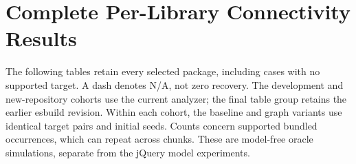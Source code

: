 \section{Complete Per-Library Connectivity Results}
\label{sec:simulation-library-results}
The following tables retain every selected package, including cases with no supported target. A dash denotes N/A, not zero recovery. The development and new-repository cohorts use the current analyzer; the final table group retains the earlier esbuild revision. Within each cohort, the baseline and graph variants use identical target pairs and initial seeds. Counts concern supported bundled occurrences, which can repeat across chunks. These are model-free oracle simulations, separate from the jQuery model experiments.


